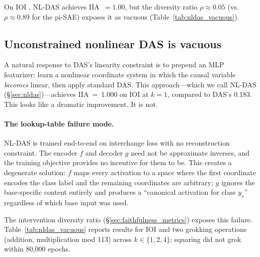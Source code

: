 \documentclass{article}
\begin{document}
On IOI \citep{wang2022interpretability}, NL-DAS achieves IIA~$= 1.00$,
but the diversity ratio $\rho \approx 0.05$ (vs.\ $\rho \approx 0.89$ for the
pi-SAE) exposes it as vacuous (Table~\ref{tab:nldas_vacuous}).

\subsection{Unconstrained nonlinear DAS is vacuous}
\label{sec:nldas_vacuous}

A natural response to DAS's linearity constraint is to prepend an MLP
featurizer: learn a nonlinear coordinate system in which the causal variable
\emph{becomes} linear, then apply standard DAS. This approach---which we call
NL-DAS (\S\ref{sec:nldas})---achieves IIA~=~1.000 on IOI at $k = 1$, compared
to DAS's 0.183. This looks like a dramatic improvement. It is not.

\paragraph{The lookup-table failure mode.}
NL-DAS is trained end-to-end on interchange loss with no reconstruction
constraint. The encoder $f$ and decoder $g$ need not be approximate inverses,
and the training objective provides no incentive for them to be. This creates a
degenerate solution: $f$ maps every activation to a space where the first
coordinate encodes the class label and the remaining coordinates are arbitrary;
$g$ ignores the base-specific content entirely and produces a ``canonical
activation for class $y_s$'' regardless of which base input was used.

The intervention diversity ratio (\S\ref{sec:faithfulness_metrics}) exposes this
failure. Table~\ref{tab:nldas_vacuous} reports results for IOI and two
grokking operations (addition, multiplication mod 113) across $k \in \{1, 2, 4\}$;
squaring did not grok within 80{,}000 epochs.
\end{document}
